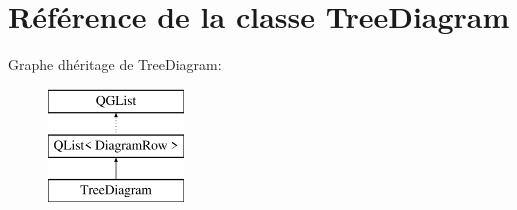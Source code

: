 \hypertarget{class_tree_diagram}{}\section{Référence de la classe Tree\+Diagram}
\label{class_tree_diagram}
Graphe d\textquotesingle{}héritage de Tree\+Diagram\+:\begin{figure}[H]
\begin{center}
\leavevmode
\includegraphics[height=3.000000cm]{class_tree_diagram}
\end{center}
\end{figure}
